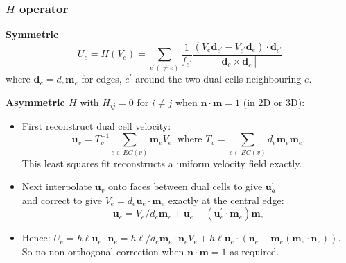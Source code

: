 \begin{frame}
\frametitle{$H$ operator}

\textbf{Symmetric} \citep*{TCD1x}
\[
U_{e}=H(V_{e})=\sum_{e^{\prime}\left(\ne e\right)}\frac{1}{f_{e^{\prime}}}\frac{\left(V_{e}\mathbf{d}_{e^{\prime}}-V_{e^{\prime}}\mathbf{d}_{e}\right)\cdot\mathbf{d}_{e^{\prime}}}{|\mathbf{d}_{e}\times\mathbf{d}_{e^{\prime}}|}
\]
{\small where $\mathbf{d}_{e}=d_{e}\mathbf{m}_{e}$ for edges, $e^{\prime}$
around the two dual cells neighbouring $e$.}


\pause
\textbf{Asymmetric $H$ }with $H_{ij}=0$ for $i\ne j$ when $\mathbf{n}\cdot\mathbf{m}=1$
(in 2D or 3D):
\begin{itemize}[<+->]
\item First reconstruct dual cell velocity:
\[
\mathbf{u}_{v}=T_{v}^{-1}\sum_{e\in EC(v)}\mathbf{m}_{e}V_{e}\ \text{ where }T_{v}=\sum_{e\in EC(v)}d_{e}\mathbf{m}_{e}\mathbf{m}_{e}.
\]
This least squares fit reconstructs a uniform velocity field exactly. 
\item Next interpolate $\mathbf{u}_{v}$ onto faces between dual cells to
give $\mathbf{u_{e}^{\prime}}$\\
and correct to give $V_{e}=d_{e}\mathbf{u}_{e}\cdot\mathbf{m}_{e}$
exactly at the central edge:
\[
\mathbf{\mathbf{u}}_{e}=V_{e}/d_{e}\mathbf{m}_{e}+\mathbf{u}_{e}^{\prime}-\left(\mathbf{u}_{e}^{\prime}\cdot\mathbf{m}_{e}\right)\mathbf{m}_{e}
\]

\item 
Hence: $U_{e}  =h\ell\mathbf{u}_{e}\cdot\mathbf{n}_{e}
 =h\ell/d_{e}\mathbf{m}_{e}\cdot\mathbf{n}_{e}V_{e}+h\ell\mathbf{u}_{e}^{\prime}\cdot\left(\mathbf{n}_{e}-\mathbf{m}_{e}\left(\mathbf{m}_{e}\cdot\mathbf{n}_{e}\right)\right)$.\\
So  no non-orthogonal correction when $\mathbf{n}\cdot\mathbf{m}=1$
as required.
\end{itemize}

\end{frame}
